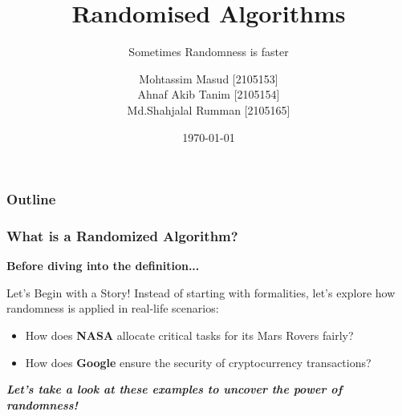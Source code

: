 \documentclass{beamer}
\title{Randomised Algorithms}
\subtitle{Sometimes Randomness is faster}
\author{Mohtassim Masud [2105153]\\ Ahnaf Akib Tanim [2105154] \\Md.Shahjalal Rumman [2105165]}
\date{\today}
\institute{Department of CSE\\Bangladesh University of Engineering and Technology}
\begin{document}
\begin{frame}[plain,t]
    \hspace*{-1cm} %
    \parbox{\textwidth}{
        \titlepage
    }
\end{frame}

\begin{frame}%
	\frametitle{Outline}
\tableofcontents
\end{frame}



\begin{frame}
    \frametitle{What is a Randomized Algorithm?}
    \textbf{Before diving into the definition...} \pause
    \vspace{0.5cm}
    \begin{block}{Let’s Begin with a Story!}
        Instead of starting with formalities, let's explore how randomness is applied in real-life scenarios: \pause
        \begin{itemize}
            \item How does \textbf{NASA} allocate critical tasks for its Mars Rovers fairly? \pause
            \item How does \textbf{Google} ensure the security of cryptocurrency transactions? \pause
        \end{itemize}
    \end{block}
    \vspace{0.8cm}
    \textbf{\textit{Let’s take a look at these examples to uncover the power of randomness!}}
\end{frame}
\end{document}
